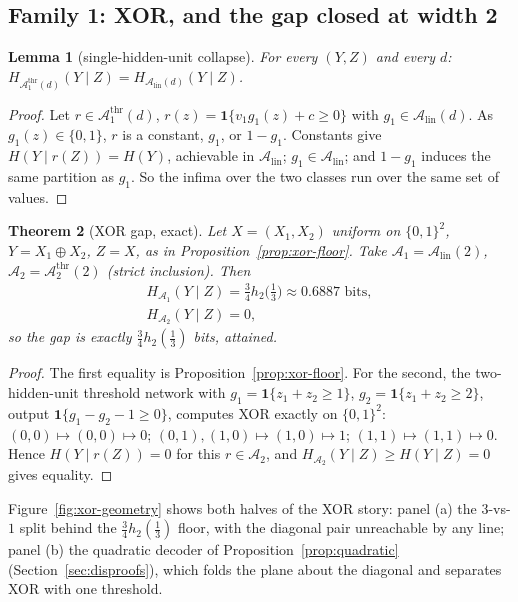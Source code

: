 \documentclass[twocolumn,10pt]{article}
\newtheorem{theorem}{Theorem}[section]
\newtheorem{lemma}[theorem]{Lemma}
\theoremstyle{definition}
\theoremstyle{remark}
\newcommand{\cA}{\mathcal{A}}
\newcommand{\Alin}{\cA_{\mathrm{lin}}}
\newcommand{\Athr}[1]{\cA^{\mathrm{thr}}_{#1}}
\newcommand{\hb}{h_2}
\begin{document}
\subsection{Family 1: XOR, and the gap closed at width 2}

\begin{lemma}[single-hidden-unit collapse]
\label{lem:collapse}
For every $(Y, Z)$ and every $d$:
$H_{\Athr{1}(d)}(Y \mid Z) = H_{\Alin(d)}(Y \mid Z)$.
\end{lemma}

\begin{proof}
Let $r \in \Athr{1}(d)$, $r(z) = \mathbf 1\{v_1 g_1(z) + c \ge 0\}$ with
$g_1 \in \Alin(d)$. As $g_1(z) \in \{0, 1\}$, $r$ is a constant, $g_1$, or
$1 - g_1$. Constants give $H(Y \mid r(Z)) = H(Y)$, achievable in $\Alin$;
$g_1 \in \Alin$; and $1 - g_1$ induces the same partition as $g_1$. So the
infima over the two classes run over the same set of values.
\end{proof}

\begin{theorem}[XOR gap, exact]
\label{thm:xor-gap}
Let $X = (X_1, X_2)$ uniform on $\{0,1\}^2$, $Y = X_1 \oplus X_2$,
$Z = X$, as in Proposition~\ref{prop:xor-floor}. Take
$\cA_1 = \Alin(2)$, $\cA_2 = \Athr{2}(2)$ (strict inclusion). Then
\begin{gather*}
H_{\cA_1}(Y \mid Z) = \tfrac34 \hb\big(\tfrac13\big) \approx 0.6887
\text{ bits},
\\
H_{\cA_2}(Y \mid Z) = 0,
\end{gather*}
so the gap is exactly $\tfrac34 \hb(\tfrac13)$ bits, attained.
\end{theorem}

\begin{proof}
The first equality is Proposition~\ref{prop:xor-floor}. For the second, the
two-hidden-unit threshold network with
$g_1 = \mathbf 1\{z_1 + z_2 \ge 1\}$, $g_2 = \mathbf 1\{z_1 + z_2 \ge 2\}$,
output $\mathbf 1\{g_1 - g_2 - 1 \ge 0\}$, computes XOR exactly on
$\{0,1\}^2$: $(0,0) \mapsto (0,0) \mapsto 0$;
$(0,1), (1,0) \mapsto (1,0) \mapsto 1$; $(1,1) \mapsto (1,1) \mapsto 0$.
Hence $H(Y \mid r(Z)) = 0$ for this $r \in \cA_2$, and
$H_{\cA_2}(Y \mid Z) \ge H(Y \mid Z) = 0$ gives equality.
\end{proof}

Figure~\ref{fig:xor-geometry} shows both halves of the XOR story:
panel (a) the $3$-vs-$1$ split behind the $\tfrac34 h_2(\tfrac13)$
floor, with the diagonal pair unreachable by any line; panel (b) the
quadratic decoder of Proposition~\ref{prop:quadratic}
(Section~\ref{sec:disproofs}), which folds the plane about the
diagonal and separates XOR with one threshold.
\end{document}

